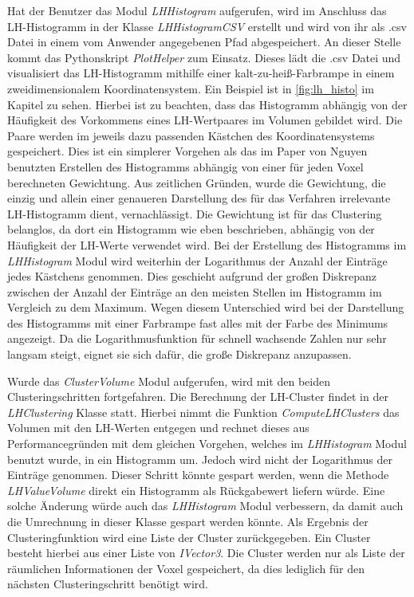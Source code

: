 Hat der Benutzer das Modul \textit{LHHistogram} aufgerufen, wird im Anschluss das LH-Histogramm in der Klasse \textit{LHHistogramCSV} erstellt und wird von ihr als .csv Datei in einem vom Anwender angegebenen Pfad abgespeichert.
An dieser Stelle kommt das Pythonskript \textit{PlotHelper} zum Einsatz. Dieses lädt die .csv Datei und visualisiert das LH-Histogramm mithilfe einer kalt-zu-heiß-Farbrampe in einem zweidimensionalem Koordinatensystem.
Ein Beispiel ist in \autoref{fig:lh_histo} im Kapitel  zu sehen. Hierbei ist zu beachten, dass das Histogramm abhängig von der Häufigkeit des Vorkommens eines LH-Wertpaares im Volumen gebildet wird. Die Paare werden im jeweils dazu passenden Kästchen des Koordinatensystems gespeichert. Dies ist ein simplerer Vorgehen als das im Paper von Nguyen \cite{nguyen2012clustering} benutzten Erstellen des Histogramms abhängig von einer für jeden Voxel berechneten Gewichtung.
\newline
Aus zeitlichen Gründen, wurde die Gewichtung, die einzig und allein einer genaueren Darstellung des für das Verfahren irrelevante LH-Histogramm dient, vernachlässigt. Die Gewichtung ist für das Clustering belanglos, da dort ein Histogramm wie eben beschrieben, abhängig von der Häufigkeit der LH-Werte verwendet wird.
Bei der Erstellung des Histogramms im \textit{LHHistogram} Modul wird weiterhin der Logarithmus der Anzahl der Einträge jedes Kästchens genommen. Dies geschieht aufgrund der großen Diskrepanz zwischen der Anzahl der Einträge an den meisten Stellen im Histogramm im Vergleich zu dem Maximum. Wegen diesem Unterschied wird bei der Darstellung des Histogramms mit einer Farbrampe fast alles mit der Farbe des Minimums angezeigt. Da die Logarithmusfunktion für schnell wachsende Zahlen nur sehr langsam steigt, eignet sie sich dafür, die große Diskrepanz anzupassen.


Wurde das \textit{ClusterVolume} Modul aufgerufen, wird mit den beiden Clusteringschritten fortgefahren. Die Berechnung der LH-Cluster findet in der \textit{LHClustering} Klasse statt. Hierbei nimmt die Funktion \textit{ComputeLHClusters} das Volumen mit den LH-Werten entgegen und rechnet dieses aus Performancegründen mit dem gleichen Vorgehen, welches im \textit{LHHistogram} Modul benutzt wurde, in ein Histogramm um. Jedoch wird nicht der Logarithmus der Einträge genommen. Dieser Schritt könnte gespart werden, wenn die Methode \textit{LHValueVolume} direkt ein Histogramm als Rückgabewert liefern würde. Eine solche Änderung würde auch das \textit{LHHistogram} Modul verbessern, da damit auch die Umrechnung in dieser Klasse gespart werden könnte.
\newline
Als Ergebnis der Clusteringfunktion wird eine Liste der Cluster zurückgegeben. Ein Cluster besteht hierbei aus einer Liste von \textit{IVector3}. Die Cluster werden nur als Liste der räumlichen Informationen der Voxel gespeichert, da dies lediglich für den nächsten Clusteringschritt benötigt wird. 


